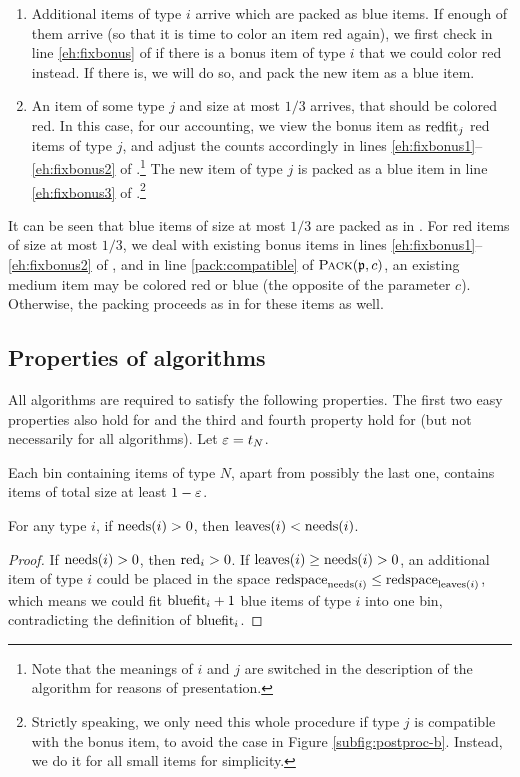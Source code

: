 \begin{enumerate}
\item
Additional items of type $i$ arrive which are packed as blue items. If enough of them arrive (so that it is time to color an item red again), we first check in line \ref{eh:fixbonus} of {\EHarm} if there is a bonus item of type $i$ that we could color red instead. If there is, we will do so, and pack the new item as a blue item.
\item
An item of some type $j$ and size at most $1/3$ arrives, that should be colored red.
In this case, for our accounting, we view the bonus item as $\mathrm{redfit}_j$ red items of type $j$, and adjust the counts accordingly in lines \ref{eh:fixbonus1}--\ref{eh:fixbonus2}
of \EHarm.\footnote{Note that the meanings of $i$
and $j$ are switched in the description of the algorithm for reasons of presentation.}
The new item of type $j$ is packed as a blue item in line \ref{eh:fixbonus3} of 
\EHarm.\footnote{Strictly speaking, we only need this whole procedure if type $j$ is compatible with the bonus item, to avoid the case in Figure \ref{subfig:postproc-b}.
Instead, we do it for all small items for simplicity.}
\end{enumerate} 



It can be seen that blue items of size at most $1/3$ are packed as in {\SuperH}.
For red items of size at most $1/3$, we deal with existing bonus items in lines \ref{eh:fixbonus1}--\ref{eh:fixbonus2} of \EHarm, and in line \ref{pack:compatible} of $\mbox{\textsc{Pack}}(\mathfrak{p},c)$, an existing medium item may be colored red or blue (the opposite of the parameter $c$).
Otherwise, the packing proceeds as in {\SuperH} for these items as well.


\subsection{Properties of {\EHarm} algorithms}

All {\EHarm} algorithms are required to satisfy the following properties.
The first two easy properties also hold for {\SuperH} and the third and fourth property hold for \Hpp{} (but not necessarily for all \SuperH{} algorithms).
Let $\varepsilon=t_N$.
\begin{aproperty}
	\label{prop:nextfit}
	Each bin containing items of type $N$, apart from possibly the last one, contains items of total size at least $1-\varepsilon$.
\end{aproperty}
\begin{aproperty}\label{prop:leaves-needs}
	For any type $i$, if $\mathrm{needs}(i)>0$, then 
	${\mathrm{leaves}(i)} < \mathrm{needs}(i)$. \end{aproperty}
\begin{proof}
If $\mathrm{needs}(i) > 0$, then $\mathrm{red}_i>0$.
If $\mathrm{leaves}(i)\ge\mathrm{needs}(i)>0$, an additional item of type $i$ could be placed in the space
$\mathrm{redspace}_{\mathrm{needs}(i)}\le \mathrm{redspace}_{\mathrm{leaves}(i)}$, which means we could fit $\mathrm{bluefit}_i+1$ blue items of type $i$ into one bin,
contradicting the definition of $\mathrm{bluefit}_i$.
\end{proof}

